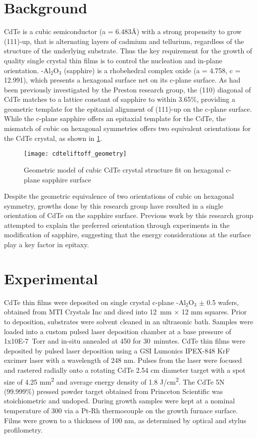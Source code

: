 \section{Background}
CdTe is a cubic semiconductor (a = 6.483\AA{}) with a strong propensity to grow (111)-up, that is alternating layers of cadmium and tellurium, regardless of the structure of the underlying substrate.
Thus the key requirement for the growth of quality single crystal thin films is to control the nucleation and in-plane orientation. \textalpha-Al\(_2\)O\(_3\) (sapphire) is a rhobehedral complex oxide (a = 4.758, c = 12.991), which presents a hexagonal surface net on its c-plane surface.
As had been previously investigated by the Preston research group, the (110) diagonal of CdTe matches to a lattice constant of sapphire to within 3.65\%, providing a geometric template for the epitaxial alignment of (111)-up on the 
c-plane surface.
While the c-plane sapphire offers an epitaxial template for the CdTe, the mismatch of cubic on hexagonal symmetries offers two equivalent orientations for the CdTe crystal, as shown in \cref{fig:cdteliftoff_geometry}.
\begin{figure}
 \centering \texttt{[image: cdteliftoff\_geometry]}
 \caption{\label{fig:cdteliftoff_geometry}Geometric model of cubic CdTe crystal structure fit on hexagonal c-plane sapphire surface}
\end{figure}
Despite the geometric equivalence of two orientations of cubic on hexagonal symmetry, growths done by this research group have resulted in a single orientation of CdTe on the sapphire surface.
Previous work by this research group attempted to explain the preferred orientation through experiments in the modification of sapphire\cite{Neretina2009b}, suggesting that the energy considerations at the surface play a key factor in epitaxy.
\section{Experimental}
CdTe thin films were deposited on single crystal c-plane \textalpha-Al\(_2\)O\(_3\) \(\pm\) 0.5\degree{} wafers, obtained from MTI Crystals Inc and diced into 12~mm \(\times\) 12 mm squares.
Prior to deposition, substrates were solvent cleaned in an ultrasonic bath.
Samples were loaded into a custom pulsed laser deposition chamber at a base pressure of 1x10E-7~Torr and in-situ annealed at 450\celsius{} for 30~minutes.
CdTe thin films were deposited by pulsed laser deposition using a GSI Lumonics IPEX-848 KrF excimer laser with a wavelength of 248 nm.
Pulses from the laser were focused and rastered radially onto a rotating CdTe 2.54 cm diameter target with a spot size of 4.25 mm\textsuperscript{2} and average energy density of 1.8 J/cm\textsuperscript{2}.
The CdTe 5N (99.999\%) pressed powder 
target obtained from Princeton Scientific was stoichiometric and undoped.
During growth samples were kept at a nominal temperature of 300\celsius{} via a Pt-Rh thermocouple on the growth furnace surface.
Films were grown to a thickness of 100 nm, as determined by optical and stylus profilometry.

